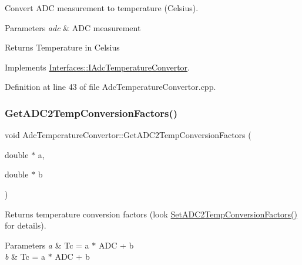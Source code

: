 Convert A\+DC measurement to temperature (Celsius). 


\begin{DoxyParams}{Parameters}
{\em adc} & A\+DC measurement \\
\hline
\end{DoxyParams}
\begin{DoxyReturn}{Returns}
Temperature in Celsius 
\end{DoxyReturn}


Implements \hyperlink{class_interfaces_1_1_i_adc_temperature_convertor_aa6283c62cbbb012954b5e51d7a969385}{Interfaces\+::\+I\+Adc\+Temperature\+Convertor}.



Definition at line 43 of file Adc\+Temperature\+Convertor.\+cpp.

\mbox{\label{class_adc_temperature_convertor_af7c23effdc32aa35c14813fd334572f2}} 
\subsubsection{\texorpdfstring{Get\+A\+D\+C2\+Temp\+Conversion\+Factors()}{GetADC2TempConversionFactors()}}
{\footnotesize\ttfamily void Adc\+Temperature\+Convertor\+::\+Get\+A\+D\+C2\+Temp\+Conversion\+Factors (\begin{DoxyParamCaption}\item[{double $\ast$}]{a,  }\item[{double $\ast$}]{b }\end{DoxyParamCaption})\hspace{0.3cm}{\ttfamily [virtual]}}



Returns temperature conversion factors (look \hyperlink{class_adc_temperature_convertor_a4850843e55992608213cc9cf82d36830}{Set\+A\+D\+C2\+Temp\+Conversion\+Factors()} for details). 


\begin{DoxyParams}{Parameters}
{\em a} & Tc = a $\ast$ A\+DC + b \\
\hline
{\em b} & Tc = a $\ast$ A\+DC + b \\
\hline
\end{DoxyParams}


